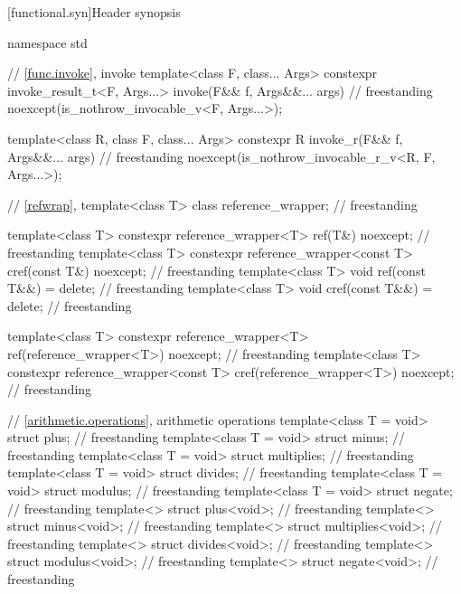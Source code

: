 [functional.syn]{Header  synopsis}

%
%
%
\begin{codeblock}
namespace std {
  // \ref{func.invoke}, invoke
  template<class F, class... Args>
    constexpr invoke_result_t<F, Args...> invoke(F&& f, Args&&... args)             // freestanding
      noexcept(is_nothrow_invocable_v<F, Args...>);

  template<class R, class F, class... Args>
    constexpr R invoke_r(F&& f, Args&&... args)                                     // freestanding
      noexcept(is_nothrow_invocable_r_v<R, F, Args...>);

  // \ref{refwrap}, 
  template<class T> class reference_wrapper;                                        // freestanding

  template<class T> constexpr reference_wrapper<T> ref(T&) noexcept;                // freestanding
  template<class T> constexpr reference_wrapper<const T> cref(const T&) noexcept;   // freestanding
  template<class T> void ref(const T&&) = delete;                                   // freestanding
  template<class T> void cref(const T&&) = delete;                                  // freestanding

  template<class T>
    constexpr reference_wrapper<T> ref(reference_wrapper<T>) noexcept;              // freestanding
  template<class T>
    constexpr reference_wrapper<const T> cref(reference_wrapper<T>) noexcept;       // freestanding

  // \ref{arithmetic.operations}, arithmetic operations
  template<class T = void> struct plus;                                             // freestanding
  template<class T = void> struct minus;                                            // freestanding
  template<class T = void> struct multiplies;                                       // freestanding
  template<class T = void> struct divides;                                          // freestanding
  template<class T = void> struct modulus;                                          // freestanding
  template<class T = void> struct negate;                                           // freestanding
  template<> struct plus<void>;                                                     // freestanding
  template<> struct minus<void>;                                                    // freestanding
  template<> struct multiplies<void>;                                               // freestanding
  template<> struct divides<void>;                                                  // freestanding
  template<> struct modulus<void>;                                                  // freestanding
  template<> struct negate<void>;                                                   // freestanding

}
\end{codeblock}
